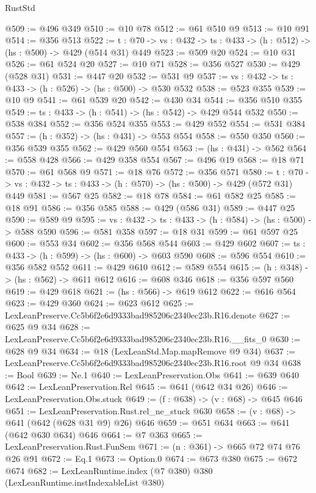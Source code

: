 \begin{lexlean}{RustStd}
\begin{coremodule}
@509 := @496 @349
@510 := @10 @78
@512 := @61 @510 @9
@513 := @10 @91
@514 := @356 @513
@522 := {t : @70} -> {vs : @432} -> {ts : @433} -> (h : @512) -> (hs : @500) -> @429 (@514 @31) @449
@523 := @509 @20
@524 := @10 @31
@526 := @61 @524 @20
@527 := @10 @71
@528 := @356 @527
@530 := @429 (@528 @31)
@531 := @447 @20
@532 := @531 @9
@537 := {vs : @432} -> {ts : @433} -> (h : @526) -> (hs : @500) -> @530 @532
@538 := @523 @355
@539 := @10 @9
@541 := @61 @539 @20
@542 := @430 @34
@544 := @356 @510 @355
@549 := {ts : @433} -> (h : @541) -> (hs : @542) -> @429 @544 @532
@550 := @538 @384
@552 := @356 @524 @355
@553 := @429 @552
@554 := @531 @384
@557 := (h : @352) -> (hs : @431) -> @553 @554
@558 := @550 @350
@560 := @356 @539 @355
@562 := @429 @560 @554
@563 := (hs : @431) -> @562
@564 := @558 @428
@566 := @429 @358 @554
@567 := @496 @19
@568 := @18 @71
@570 := @61 @568 @9
@571 := @18 @76
@572 := @356 @571
@580 := {t : @70} -> {vs : @432} -> {ts : @433} -> (h : @570) -> (hs : @500) -> @429 (@572 @31) @449
@581 := @567 @25
@582 := @18 @78
@584 := @61 @582 @25
@585 := @18 @91
@586 := @356 @585
@588 := @429 (@586 @31)
@589 := @447 @25
@590 := @589 @9
@595 := {vs : @432} -> {ts : @433} -> (h : @584) -> (hs : @500) -> @588 @590
@596 := @581 @358
@597 := @18 @31
@599 := @61 @597 @25
@600 := @553 @34
@602 := @356 @568 @544
@603 := @429 @602
@607 := {ts : @433} -> (h : @599) -> (hs : @600) -> @603 @590
@608 := @596 @554
@610 := @356 @582 @552
@611 := @429 @610
@612 := @589 @554
@615 := (h : @348) -> (hs : @562) -> @611 @612
@616 := @608 @346
@618 := @356 @597 @560
@619 := @429 @618
@621 := (hs : @566) -> @619 @612
@622 := @616 @564
@623 := @429 @360
@624 := @623 @612
@625 := LexLeanPreserve.Cc5b6f2e6d9333bad985206c2340ec23b.R16.denote
@627 := @625 @9 @34
@628 := LexLeanPreserve.Cc5b6f2e6d9333bad985206c2340ec23b.R16.__fits_0
@630 := @628 @9 @34
@634 := @18 (LexLeanStd.Map.mapRemove @9 @34)
@637 := LexLeanPreserve.Cc5b6f2e6d9333bad985206c2340ec23b.R16.root @9 @34
@638 := Bool
@639 := Ne.{1}
@640 := LexLeanPreservation.Obs
@641 := @639 @640
@642 := LexLeanPreservation.Rel
@645 := @641 (@642 @34 @26)
@646 := LexLeanPreservation.Obs.stuck
@649 := (f : @638) -> (v : @68) -> @645 @646
@651 := LexLeanPreservation.Rust.rel_ne_stuck @630
@658 := (v : @68) -> @641 (@642 (@628 @31 @9) @26) @646
@659 := @651 @634
@663 := @641 (@642 @630 @634) @646
@664 := @7 @363
@665 := LexLeanPreservation.Rust.FunSem
@671 := (n : @361) -> @665 @72 @74 @76 @26 @91
@672 := Eq.{1}
@673 := Option.{0}
@674 := @673 @380
@675 := @672 @674
@682 := LexLeanRuntime.index (@7 @380) @380 (LexLeanRuntime.instIndexableList @380)

\end{coremodule}
\end{lexlean}
